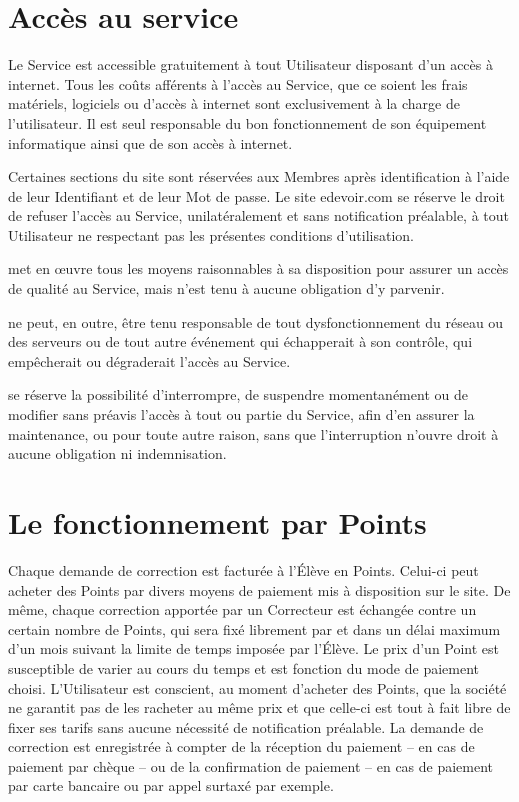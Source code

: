\section{Accès au service}

Le Service est accessible gratuitement à tout Utilisateur disposant d'un accès à internet. Tous les coûts afférents à l'accès au Service, que ce soient les frais matériels, logiciels ou d'accès à internet sont exclusivement à la charge de l'utilisateur. Il est seul responsable du bon fonctionnement de son équipement informatique ainsi que de son accès à internet.

Certaines sections du site sont réservées aux Membres après identification à l'aide de leur Identifiant et de leur Mot de passe.
Le site edevoir.com se réserve le droit de refuser l'accès au Service, unilatéralement et sans notification préalable, à tout Utilisateur ne respectant pas les présentes conditions d'utilisation.

\eDevoir met en œuvre tous les moyens raisonnables à sa disposition pour assurer un accès de qualité au Service, mais n'est tenu à aucune obligation d'y parvenir.

\eDevoir ne peut, en outre, être tenu responsable de tout dysfonctionnement du réseau ou des serveurs ou de tout autre événement qui échapperait à son contrôle, qui empêcherait ou dégraderait l'accès au Service.

\eDevoir se réserve la possibilité d'interrompre, de suspendre momentanément ou de modifier sans préavis l'accès à tout ou partie du Service, afin d'en assurer la maintenance, ou pour toute autre raison, sans que l'interruption n'ouvre droit à aucune obligation ni indemnisation.


\section{Le fonctionnement par Points}

Chaque demande de correction est facturée à l'Élève en Points. Celui-ci peut acheter des Points par divers moyens de paiement mis à disposition sur le site. De même, chaque correction apportée par un Correcteur est échangée contre un certain nombre de Points, qui sera fixé librement par \eDevoir et dans un délai maximum d'un mois suivant la limite de temps imposée par l'Élève. Le prix d'un Point est susceptible de varier au cours du temps et est fonction du mode de paiement choisi. L'Utilisateur est conscient, au moment d'acheter des Points, que la société \eDevoir ne garantit pas de les racheter au même prix et que celle-ci est tout à fait libre de fixer ses tarifs sans aucune nécessité de notification préalable.
La demande de correction est enregistrée à compter de la réception du paiement -- en cas de paiement par chèque -- ou de la confirmation de paiement -- en cas de paiement par carte bancaire ou par appel surtaxé par exemple.

